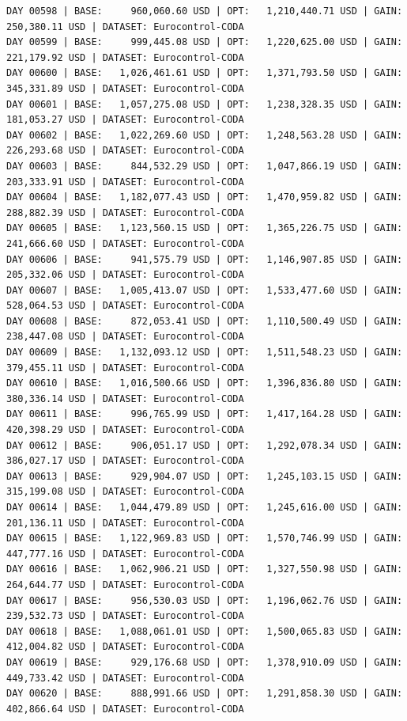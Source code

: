 \documentclass[11pt,a4paper]{article}
\begin{document}
\begin{verbatim}
DAY 00598 | BASE:     960,060.60 USD | OPT:   1,210,440.71 USD | GAIN: 250,380.11 USD | DATASET: Eurocontrol-CODA
DAY 00599 | BASE:     999,445.08 USD | OPT:   1,220,625.00 USD | GAIN: 221,179.92 USD | DATASET: Eurocontrol-CODA
DAY 00600 | BASE:   1,026,461.61 USD | OPT:   1,371,793.50 USD | GAIN: 345,331.89 USD | DATASET: Eurocontrol-CODA
DAY 00601 | BASE:   1,057,275.08 USD | OPT:   1,238,328.35 USD | GAIN: 181,053.27 USD | DATASET: Eurocontrol-CODA
DAY 00602 | BASE:   1,022,269.60 USD | OPT:   1,248,563.28 USD | GAIN: 226,293.68 USD | DATASET: Eurocontrol-CODA
DAY 00603 | BASE:     844,532.29 USD | OPT:   1,047,866.19 USD | GAIN: 203,333.91 USD | DATASET: Eurocontrol-CODA
DAY 00604 | BASE:   1,182,077.43 USD | OPT:   1,470,959.82 USD | GAIN: 288,882.39 USD | DATASET: Eurocontrol-CODA
DAY 00605 | BASE:   1,123,560.15 USD | OPT:   1,365,226.75 USD | GAIN: 241,666.60 USD | DATASET: Eurocontrol-CODA
DAY 00606 | BASE:     941,575.79 USD | OPT:   1,146,907.85 USD | GAIN: 205,332.06 USD | DATASET: Eurocontrol-CODA
DAY 00607 | BASE:   1,005,413.07 USD | OPT:   1,533,477.60 USD | GAIN: 528,064.53 USD | DATASET: Eurocontrol-CODA
DAY 00608 | BASE:     872,053.41 USD | OPT:   1,110,500.49 USD | GAIN: 238,447.08 USD | DATASET: Eurocontrol-CODA
DAY 00609 | BASE:   1,132,093.12 USD | OPT:   1,511,548.23 USD | GAIN: 379,455.11 USD | DATASET: Eurocontrol-CODA
DAY 00610 | BASE:   1,016,500.66 USD | OPT:   1,396,836.80 USD | GAIN: 380,336.14 USD | DATASET: Eurocontrol-CODA
DAY 00611 | BASE:     996,765.99 USD | OPT:   1,417,164.28 USD | GAIN: 420,398.29 USD | DATASET: Eurocontrol-CODA
DAY 00612 | BASE:     906,051.17 USD | OPT:   1,292,078.34 USD | GAIN: 386,027.17 USD | DATASET: Eurocontrol-CODA
DAY 00613 | BASE:     929,904.07 USD | OPT:   1,245,103.15 USD | GAIN: 315,199.08 USD | DATASET: Eurocontrol-CODA
DAY 00614 | BASE:   1,044,479.89 USD | OPT:   1,245,616.00 USD | GAIN: 201,136.11 USD | DATASET: Eurocontrol-CODA
DAY 00615 | BASE:   1,122,969.83 USD | OPT:   1,570,746.99 USD | GAIN: 447,777.16 USD | DATASET: Eurocontrol-CODA
DAY 00616 | BASE:   1,062,906.21 USD | OPT:   1,327,550.98 USD | GAIN: 264,644.77 USD | DATASET: Eurocontrol-CODA
DAY 00617 | BASE:     956,530.03 USD | OPT:   1,196,062.76 USD | GAIN: 239,532.73 USD | DATASET: Eurocontrol-CODA
DAY 00618 | BASE:   1,088,061.01 USD | OPT:   1,500,065.83 USD | GAIN: 412,004.82 USD | DATASET: Eurocontrol-CODA
DAY 00619 | BASE:     929,176.68 USD | OPT:   1,378,910.09 USD | GAIN: 449,733.42 USD | DATASET: Eurocontrol-CODA
DAY 00620 | BASE:     888,991.66 USD | OPT:   1,291,858.30 USD | GAIN: 402,866.64 USD | DATASET: Eurocontrol-CODA

\end{verbatim}
\end{document}
